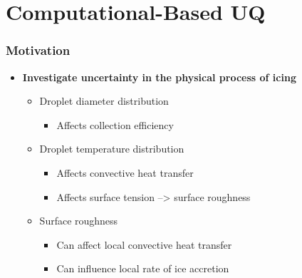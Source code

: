 \documentclass[9pt]{beamer}
\begin{document}
\section{Computational-Based UQ}
\label{sec-3}
\begin{frame}
\frametitle{Motivation}
\label{sec-3-1}

\begin{itemize}
\item \textbf{Investigate uncertainty in the physical process of icing}
\begin{itemize}
\item Droplet diameter distribution
\begin{itemize}
\item Affects collection efficiency
\end{itemize}
\item Droplet temperature distribution
\begin{itemize}
\item Affects convective heat transfer
\item Affects surface tension --> surface roughness
\end{itemize}
\item Surface roughness
\begin{itemize}
\item Can affect local convective heat transfer
\item Can influence local rate of ice accretion
\end{itemize}
\end{itemize}
\end{itemize}
\end{frame}
\end{document}
